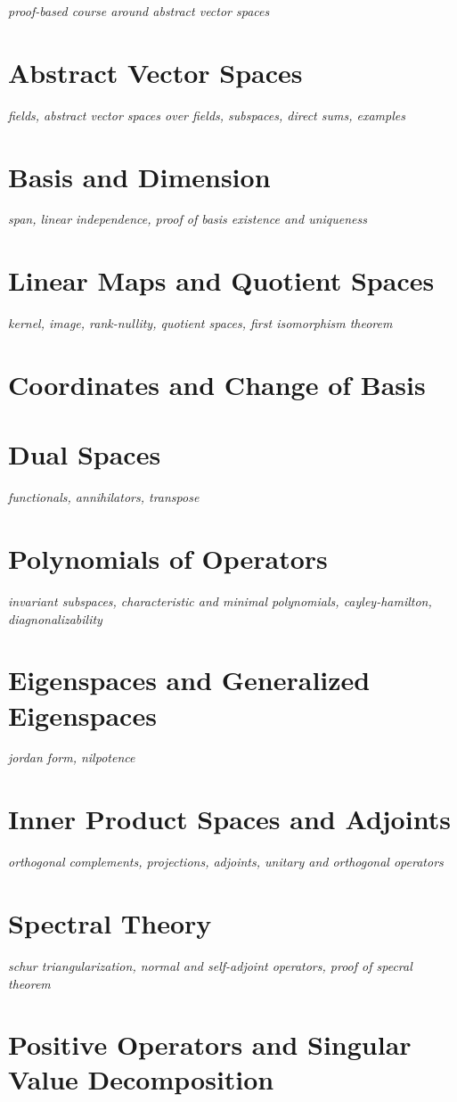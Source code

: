 \documentclass[../../../main.tex]{subfiles}
\begin{document}

\textit{proof-based course around abstract vector spaces}

\section{Abstract Vector Spaces}
\textit{fields, abstract vector spaces over fields, subspaces, direct sums, examples}
\section{Basis and Dimension}
\textit{span, linear independence, proof of basis existence and uniqueness}
\section{Linear Maps and Quotient Spaces}
\textit{kernel, image, rank-nullity, quotient spaces, first isomorphism theorem}
\section{Coordinates and Change of Basis}
\section{Dual Spaces}
\textit{functionals, annihilators, transpose}
\section{Polynomials of Operators}
\textit{invariant subspaces, characteristic and minimal polynomials, cayley-hamilton, diagnonalizability}
\section{Eigenspaces and Generalized Eigenspaces}
\textit{jordan form, nilpotence}
\section{Inner Product Spaces and Adjoints}
\textit{orthogonal complements, projections, adjoints, unitary and orthogonal operators}
\section{Spectral Theory}
\textit{schur triangularization, normal and self-adjoint operators, proof of specral theorem}
\section{Positive Operators and Singular Value Decomposition}

\printbibliography[
    heading=subbibintoc,
    title={References}
]
\end{document}
